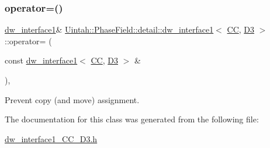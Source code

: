 \subsubsection{\texorpdfstring{operator=()}{operator=()}}
{\footnotesize\ttfamily \hyperlink{classUintah_1_1PhaseField_1_1detail_1_1dw__interface1}{dw\+\_\+interface1}\& \hyperlink{classUintah_1_1PhaseField_1_1detail_1_1dw__interface1}{Uintah\+::\+Phase\+Field\+::detail\+::dw\+\_\+interface1}$<$ \hyperlink{namespaceUintah_1_1PhaseField_a33d355affda78a83f45755ba8388cedda22303704507d024d1d6508ed9859a85a}{CC}, \hyperlink{namespaceUintah_1_1PhaseField_a12bfc68444894dffdf0cb8d9cf0cc76aa72fd61934c7ca788c49ad90629f76e78}{D3} $>$\+::operator= (\begin{DoxyParamCaption}\item[{const \hyperlink{classUintah_1_1PhaseField_1_1detail_1_1dw__interface1}{dw\+\_\+interface1}$<$ \hyperlink{namespaceUintah_1_1PhaseField_a33d355affda78a83f45755ba8388cedda22303704507d024d1d6508ed9859a85a}{CC}, \hyperlink{namespaceUintah_1_1PhaseField_a12bfc68444894dffdf0cb8d9cf0cc76aa72fd61934c7ca788c49ad90629f76e78}{D3} $>$ \&}]{ }\end{DoxyParamCaption})\hspace{0.3cm}{\ttfamily [protected]}, {\ttfamily [delete]}}



Prevent copy (and move) assignment. 



The documentation for this class was generated from the following file\+:\begin{DoxyCompactItemize}
\item 
\hyperlink{dw__interface1__CC__D3_8h}{dw\+\_\+interface1\+\_\+\+C\+C\+\_\+\+D3.\+h}\end{DoxyCompactItemize}
